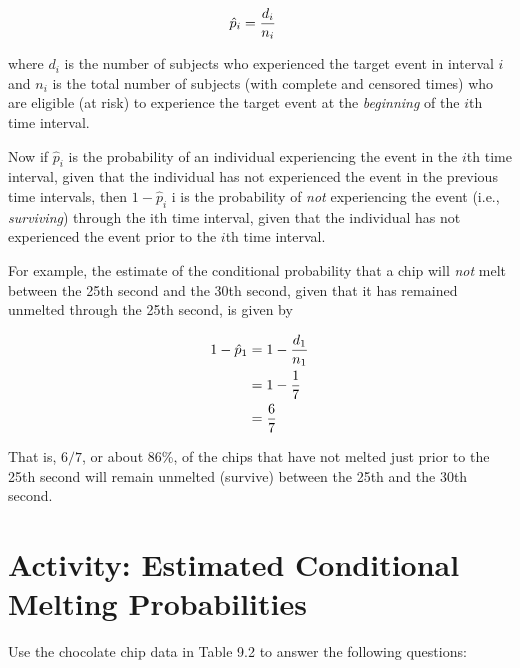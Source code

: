 \documentclass[
]{report}
\begin{document}
\begin{align}
\hat p_i &= \frac{d_i}{n_i}
\notag
\end{align}

where \(d_i\) is the number of subjects who experienced the target event in interval \(i\) and \(n_i\) is the total number of subjects (with complete and censored times) who are eligible (at risk) to experience the target event at the \emph{beginning} of the \(i\)th time interval.

Now if \(\hat p_i\) is the probability of an individual experiencing the event in the \(i\)th time interval, given that the
individual has not experienced the event in the previous time intervals, then \(1 - \hat p_i\)
i is the probability of \emph{not} experiencing the event (i.e., \emph{surviving}) through the ith time interval, given that the individual has not experienced the event prior to the \(i\)th time interval.

For example, the estimate of the conditional probability that a chip will \emph{not} melt between the 25th second
and the 30th second, given that it has remained unmelted through the 25th second, is given by

\begin{align}
1 - \hat p_1 &= 1 - \frac{d_1}{n_1} \notag \\
&= 1 - \frac{1}{7} \notag \\
&= \frac{6}{7} \notag
\end{align}

That is, \(6/7\), or about 86\%, of the chips that have not melted just prior to the 25th second will remain unmelted (survive) between the 25th and the 30th second.

\section*{Activity: Estimated Conditional Melting Probabilities}\label{activity-estimated-conditional-melting-probabilities}

Use the chocolate chip data in Table 9.2 to answer the following questions:
\end{document}
